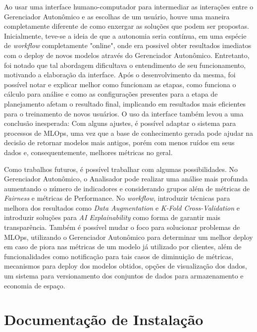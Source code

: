 \documentclass[portugues]{ic-tese}
\begin{document}
Ao usar uma interface humano-computador para intermediar as interações entre o Gerenciador Autonômico e as escolhas de um usuário, houve uma maneira completamente diferente de como enxergar as soluções que podem ser propostas. Inicialmente, teve-se a ideia de que a autonomia seria contínua, em uma espécie de \textit{workflow} completamente "online", onde era possivel obter resultados imediatos com o deploy de novos modelos através do Gerenciador Autonômico. Entretanto, foi notado que tal abordagem dificultava o entendimento de seu funcionamento, motivando a elaboração da interface. Após o desenvolvimento da mesma, foi possível notar e explicar melhor como funcionam as etapas, como funciona o cálculo para análise e como as configurações presentes para a etapa de planejamento afetam o resultado final, implicando em resultados mais eficientes para o treinamento de novos usuários. O uso da interface também levou a uma conclusão inesperada: Com alguns ajustes, é possível adaptar o sistema para processos de MLOps, uma vez que a base de conhecimento gerada pode ajudar na decisão de retornar modelos mais antigos, porém com menos ruídos em seus dados e, consequentemente, melhores métricas no geral. 

Como trabalhos futuros, é possível trabalhar com algumas possibilidades. No Gerenciador Autonômico, o Analisador pode realizar uma análise mais profunda aumentando o número de indicadores e considerando grupos além de métricas de \textit{Fairness} e métricas de Performance. No \textit{workflow}, introduzir técnicas para melhora dos resultados como \textit{Data Augmentation} e \textit{K-Fold Cross-Validation} e introduzir soluções para \textit{AI Explainability} como forma de garantir mais transparência. Também é possível mudar o foco para solucionar problemas de MLOps, utilizando o Gerenciador Autonômico para determinar um melhor deploy em caso de piora nas métricas de um modelo já utilizado por clientes, além de funcionalidades como notificação para tais casos de diminuição de métricas, mecanismos para deploy dos modelos obtidos, opções de visualização dos dados, um sistema para versionamento dos conjuntos de dados para armazenamento e economia de espaço.




\appendix
\chapter{Documentação de Instalação}
\label{ann:DocInstall}
\end{document}
